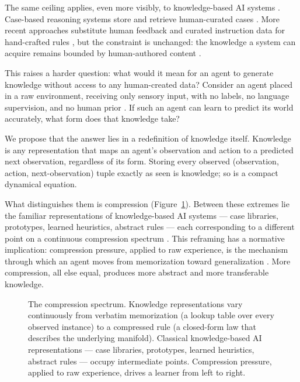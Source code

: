 \documentclass[letterpaper]{article} %
\begin{document}
The same ceiling applies, even more visibly, to knowledge-based AI systems \citep{lenat1991thresholds}. Case-based reasoning systems store and retrieve human-curated cases \citep{aamodt1994casebased}. More recent approaches substitute human feedback and curated instruction data for hand-crafted rules \citep{ouyang2022training, wang2023selfinstruct}, but the constraint is unchanged: the knowledge a system can acquire remains bounded by human-authored content \citep{gan2025reversebottleneck}.

This raises a harder question: what would it mean for an agent to generate knowledge without access to any human-created data? Consider an agent placed in a raw environment, receiving only sensory input, with no labels, no language supervision, and no human prior \citep{lecun2022path}. If such an agent can learn to predict its world accurately, what form does that knowledge take?

We propose that the answer lies in a redefinition of knowledge itself. Knowledge is any representation that maps an agent's observation and action to a predicted next observation, regardless of its form. Storing every observed (observation, action, next-observation) tuple exactly as seen is knowledge; so is a compact dynamical equation.

What distinguishes them is compression (Figure~\ref{fig:compression-spectrum}). Between these extremes lie the familiar representations of knowledge-based AI systems --- case libraries, prototypes, learned heuristics, abstract rules --- each corresponding to a different point on a continuous compression spectrum \citep{tishby1999information}. This reframing has a normative implication: compression pressure, applied to raw experience, is the mechanism through which an agent moves from memorization toward generalization \citep{shwartz2017opening}. More compression, all else equal, produces more abstract and more transferable knowledge.

\begin{figure}[t]
    \centering
    
    \caption{The compression spectrum. Knowledge representations vary continuously from verbatim memorization (a lookup table over every observed instance) to a compressed rule (a closed-form law that describes the underlying manifold). Classical knowledge-based AI representations --- case libraries, prototypes, learned heuristics, abstract rules --- occupy intermediate points. Compression pressure, applied to raw experience, drives a learner from left to right.}
    \label{fig:compression-spectrum}
\end{figure}
\end{document}
